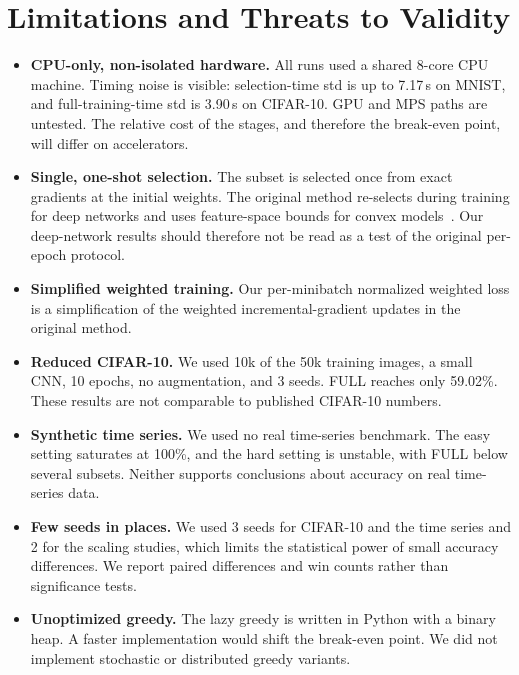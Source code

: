\documentclass[conference]{IEEEtran}
\begin{document}
\section{Limitations and Threats to Validity}
\label{sec:limitations}
\begin{itemize}
\item \textbf{CPU-only, non-isolated hardware.} All runs used a shared 8-core CPU machine. Timing noise is visible: selection-time std is up to 7.17\,s on MNIST, and full-training-time std is 3.90\,s on CIFAR-10. GPU and MPS paths are untested. The relative cost of the stages, and therefore the break-even point, will differ on accelerators.
\item \textbf{Single, one-shot selection.} The subset is selected once from exact gradients at the initial weights. The original method re-selects during training for deep networks and uses feature-space bounds for convex models~\cite{mirzasoleiman2020craig}. Our deep-network results should therefore not be read as a test of the original per-epoch protocol.
\item \textbf{Simplified weighted training.} Our per-minibatch normalized weighted loss is a simplification of the weighted incremental-gradient updates in the original method.
\item \textbf{Reduced CIFAR-10.} We used 10k of the 50k training images, a small CNN, 10 epochs, no augmentation, and 3 seeds. FULL reaches only 59.02\%. These results are not comparable to published CIFAR-10 numbers.
\item \textbf{Synthetic time series.} We used no real time-series benchmark. The easy setting saturates at 100\%, and the hard setting is unstable, with FULL below several subsets. Neither supports conclusions about accuracy on real time-series data.
\item \textbf{Few seeds in places.} We used 3 seeds for CIFAR-10 and the time series and 2 for the scaling studies, which limits the statistical power of small accuracy differences. We report paired differences and win counts rather than significance tests.
\item \textbf{Unoptimized greedy.} The lazy greedy is written in Python with a binary heap. A faster implementation would shift the break-even point. We did not implement stochastic or distributed greedy variants.
\end{itemize}
\end{document}
